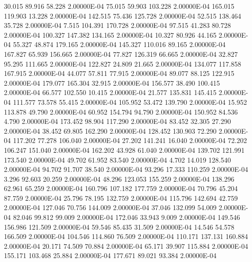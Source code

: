     30.015    89.916    58.228  2.00000E-04
    75.015    59.903   103.228  2.00000E-04
   165.015   119.903    13.228  2.00000E-04
   142.515    75.436   125.728  2.00000E-04
    52.515   138.464    35.728  2.00000E-04
     7.515   104.391   170.728  2.00000E-04
    97.515    41.283    80.728  2.00000E-04
   100.327   147.382   134.165  2.00000E-04
    10.327    80.926    44.165  2.00000E-04
    55.327    48.874   179.165  2.00000E-04
   145.327   110.016    89.165  2.00000E-04
   167.827    65.939   156.665  2.00000E-04
    77.827   126.319    66.665  2.00000E-04
    32.827    95.295   111.665  2.00000E-04
   122.827    24.809    21.665  2.00000E-04
   134.077   117.858   167.915  2.00000E-04
    44.077    57.811    77.915  2.00000E-04
    89.077    88.125   122.915  2.00000E-04
   179.077   165.304    32.915  2.00000E-04
   156.577    38.490   100.415  2.00000E-04
    66.577   102.550    10.415  2.00000E-04
    21.577   135.831   145.415  2.00000E-04
   111.577    73.578    55.415  2.00000E-04
   105.952    53.472   139.790  2.00000E-04
    15.952   113.878    49.790  2.00000E-04
    60.952   154.794    94.790  2.00000E-04
   150.952    84.536     4.790  2.00000E-04
   173.452    98.904   117.290  2.00000E-04
    83.452    32.305    27.290  2.00000E-04
    38.452    69.805   162.290  2.00000E-04
   128.452   130.903    72.290  2.00000E-04
   117.202    77.278   106.040  2.00000E-04
    27.202   141.241    16.040  2.00000E-04
    72.202   106.247   151.040  2.00000E-04
   162.202    43.928    61.040  2.00000E-04
   139.702   121.991   173.540  2.00000E-04
    49.702    61.952    83.540  2.00000E-04
     4.702    14.019   128.540  2.00000E-04
    94.702    91.707    38.540  2.00000E-04
    93.296    17.333   110.259  2.00000E-04
     3.296    92.603    20.259  2.00000E-04
    48.296   123.053   155.259  2.00000E-04
   138.296    62.961    65.259  2.00000E-04
   160.796   107.182   177.759  2.00000E-04
    70.796    45.204    87.759  2.00000E-04
    25.796    78.195   132.759  2.00000E-04
   115.796   142.694    42.759  2.00000E-04
   127.046    70.756   144.009  2.00000E-04
    37.046   132.099    54.009  2.00000E-04
    82.046    99.812    99.009  2.00000E-04
   172.046    33.943     9.009  2.00000E-04
   149.546   156.986   121.509  2.00000E-04
    59.546    85.435    31.509  2.00000E-04
    14.546    54.578   166.509  2.00000E-04
   104.546   114.860    76.509  2.00000E-04
   110.171   137.131   160.884  2.00000E-04
    20.171    74.509    70.884  2.00000E-04
    65.171    39.907   115.884  2.00000E-04
   155.171   103.468    25.884  2.00000E-04
   177.671    89.021    93.384  2.00000E-04
